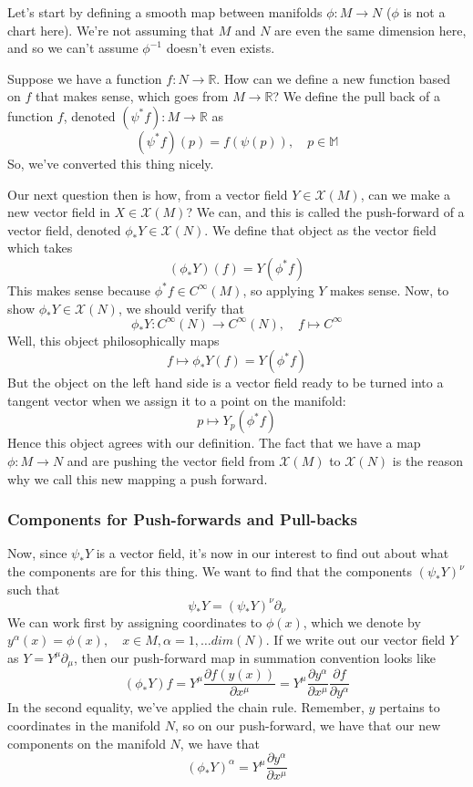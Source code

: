 \documentclass[11pt, a4paper]{article}   	%
\theoremstyle{slplain}
\begin{document}
Let's start by defining a smooth map between manifolds $\phi : M \rightarrow N$ ($\phi$ is not a chart here). We're not assuming that $M$ and $N$ are even the same dimension here, and so we can't assume $\phi^{ -1} $ doesn't even exists. 

Suppose we have a function $f: N \rightarrow \mathbb{R} $. How can we define a new function based on $f$ that makes sense, which goes from $M \rightarrow \mathbb{ R} $? We define the pull back of a function $f$, denoted $(\psi^* f) : M \rightarrow \mathbb{R} $ as 
\[
( \psi^* f ) ( p )  = f ( \psi ( p ) ), \quad p \in \mathbb{ M } 
\] So, we've converted this thing nicely. 

Our next question then is how, from a vector field $Y \in \mathcal{X} ( M )$, can we make a new vector field in $X \in \mathcal{X} ( M ) $? We can, and this is called the push-forward of a vector field, denoted $ \phi_* Y \in \mathcal{ X} ( N )$. We define that object as the vector field which takes 
\[ 
(\phi_*  Y ) ( f)  = Y ( \phi^* f ) 
\] 
This makes sense because $\phi^* f \in C^{\infty} ( M )$, so applying $Y$ makes sense. Now, to show $\phi_* Y \in \mathcal{X} ( N )$, we should verify that 
\[ 
\phi_* Y : C^\infty ( N ) \rightarrow C^\infty( N ), \quad f \mapsto C^{\infty} 
\] 
Well, this object philosophically maps 
\[ 
 f \mapsto \phi_* Y ( f)  = Y ( \phi^* f ) 
\]  But the object on the left hand side is a vector field ready to be turned into a tangent vector when we assign it to a point on the manifold: 
\[ 
p \mapsto Y_p ( \phi^* f ) 
\] Hence this object agrees with our definition. The fact that we have a map $\phi: M \rightarrow N$ and are pushing the vector field from $\mathcal{ X} ( M ) $ to $\mathcal{ X} ( N )$ is the reason why we call this new mapping a push forward. 

\subsubsection{Components for Push-forwards and Pull-backs} 
Now, since $\psi_* Y $ is a vector field, it's now in our interest to find out about what the components are for this thing. We want to find that the components $( \psi_*Y )^\nu$ such that 
\[ 
\psi_* Y  = ( \psi_* Y )^\nu \partial_\nu 
\]
We can work first by assigning coordinates to $\phi( x )$, which we denote by $y^\alpha  ( x) = \phi( x), \quad x\in M,  \alpha = 1, \dots dim(N)$. 
If we write out our vector field $Y$ as $Y  = Y^\mu\partial_\mu$, then our push-forward map in summation convention looks like 
\[ 
(\phi_* Y ) f = Y^\mu \frac{\partial f ( y ( x))}{ \partial x^\mu}  = Y^\mu \frac{ \partial y^\alpha }{ \partial x^\mu } \frac{ \partial f}{ \partial y^\alpha } 
\] 
In the second equality, we've applied the chain rule. Remember, $y$ pertains to coordinates in the manifold $N$, so on our push-forward, we have that our new components on the manifold $N$, we have that 
\[ 
(\phi_* Y )^\alpha  = Y^\mu \frac{ \partial y^\alpha }{ \partial x^\mu } 
\] 
\end{document}
